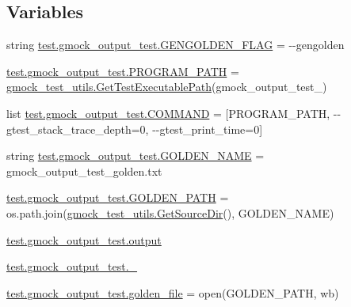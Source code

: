 \subsection*{Variables}
\begin{DoxyCompactItemize}
\item 
string \mbox{\hyperlink{namespacetest_1_1gmock__output__test_a3d9dd171dea13f59c150c8a9d6c1bd63}{test.\+gmock\+\_\+output\+\_\+test.\+G\+E\+N\+G\+O\+L\+D\+E\+N\+\_\+\+F\+L\+AG}} = \textquotesingle{}-\/-\/gengolden\textquotesingle{}
\item 
\mbox{\hyperlink{namespacetest_1_1gmock__output__test_a894e7646d8d14aaf198cc69dea7ecb08}{test.\+gmock\+\_\+output\+\_\+test.\+P\+R\+O\+G\+R\+A\+M\+\_\+\+P\+A\+TH}} = \mbox{\hyperlink{namespacegmock__test__utils_aadd2927024e24f0c53f7ba283402cdb1}{gmock\+\_\+test\+\_\+utils.\+Get\+Test\+Executable\+Path}}(\textquotesingle{}gmock\+\_\+output\+\_\+test\+\_\+\textquotesingle{})
\item 
list \mbox{\hyperlink{namespacetest_1_1gmock__output__test_a30ee99458fc8aa49b062810bac29118f}{test.\+gmock\+\_\+output\+\_\+test.\+C\+O\+M\+M\+A\+ND}} = \mbox{[}P\+R\+O\+G\+R\+A\+M\+\_\+\+P\+A\+TH, \textquotesingle{}-\/-\/gtest\+\_\+stack\+\_\+trace\+\_\+depth=0\textquotesingle{}, \textquotesingle{}-\/-\/gtest\+\_\+print\+\_\+time=0\textquotesingle{}\mbox{]}
\item 
string \mbox{\hyperlink{namespacetest_1_1gmock__output__test_a44f96ff6816d6080b14e46b1c847736a}{test.\+gmock\+\_\+output\+\_\+test.\+G\+O\+L\+D\+E\+N\+\_\+\+N\+A\+ME}} = \textquotesingle{}gmock\+\_\+output\+\_\+test\+\_\+golden.\+txt\textquotesingle{}
\item 
\mbox{\hyperlink{namespacetest_1_1gmock__output__test_afd31f75a24e5cf0ca7e226b696305fe0}{test.\+gmock\+\_\+output\+\_\+test.\+G\+O\+L\+D\+E\+N\+\_\+\+P\+A\+TH}} = os.\+path.\+join(\mbox{\hyperlink{namespacegmock__test__utils_ab7217591e655e80392c9db6b99d04765}{gmock\+\_\+test\+\_\+utils.\+Get\+Source\+Dir}}(), G\+O\+L\+D\+E\+N\+\_\+\+N\+A\+ME)
\item 
\mbox{\hyperlink{namespacetest_1_1gmock__output__test_a8a20a311d6bf8eaa4e536242ade48011}{test.\+gmock\+\_\+output\+\_\+test.\+output}}
\item 
\mbox{\hyperlink{namespacetest_1_1gmock__output__test_ad45b79b092c3872733487fbf0e86a738}{test.\+gmock\+\_\+output\+\_\+test.\+\_\+}}
\item 
\mbox{\hyperlink{namespacetest_1_1gmock__output__test_a0a2750f2a710016f3a48240066ee34aa}{test.\+gmock\+\_\+output\+\_\+test.\+golden\+\_\+file}} = open(G\+O\+L\+D\+E\+N\+\_\+\+P\+A\+TH, \textquotesingle{}wb\textquotesingle{})
\end{DoxyCompactItemize}
